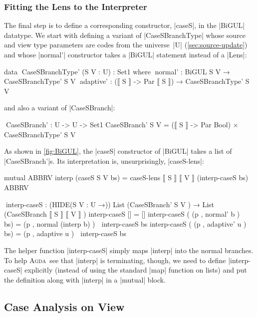 \documentclass{sigplanconf}
\newcommand{\Agda}{\textsc{Agda}}
\begin{document}
\subsubsection{Fitting the Lens to the Interpreter}

The final step is to define a corresponding constructor, |caseS|, in the |BiGUL| datatype.
We start with defining a variant of |CaseSBranchType| whose source and view type parameters are codes from the universe~|U| (\autoref{sec:source-update}) and whose |normal'| constructor takes a |BiGUL| statement instead of a |Lens|:
\begin{code}
data ^^^CaseSBranchType' (S V : U) : Set1 where
  ^^^normal'    : BiGUL S V             → CaseSBranchType' S V
  ^^^adaptive'  : (⟦ S ⟧ -> Par ⟦ S ⟧)  → CaseSBranchType' S V
\end{code}
and also a variant of |CaseSBranch|:
\begin{code}
^^^CaseSBranch' : U -> U -> Set1
CaseSBranch' S V =
  (⟦ S ⟧ -> Par Bool) × CaseSBranchType' S V
\end{code}
As shown in \autoref{fig:BiGUL}, the |caseS| constructor of |BiGUL| takes a list of |CaseSBranch'|s.
Its interpretation is, unsurprisingly, |caseS-lens|:
\begin{code}
mutual
  ABBRV
  interp (caseS {S} {V} bs) =
    caseS-lens ⟦ S ⟧ ⟦ V ⟧ (interp-caseS bs)
  ABBRV
  
  ^^^interp-caseS : (HIDE({S V : U} →))  List (CaseSBranch'   S      V    ) →
                                         List (CaseSBranch ⟦  S ⟧ ⟦  V ⟧  )
  interp-caseS []                                    = []
  interp-caseS (  (p , normal'  b           ) ∷ bs)  =
                  (p , normal   (interp b)  ) ∷ interp-caseS bs
  interp-caseS (  (p , adaptive'  u         ) ∷ bs)  =
                  (p , adaptive   u         ) ∷ interp-caseS bs
\end{code}
The helper function |interp-caseS| simply maps |interp| into the normal branches.
To help \Agda\ see that |interp| is terminating, though, we need to define |interp-caseS| explicitly (instead of using the standard |map| function on lists) and put the definition along with |interp| in a |mutual| block.

\subsection{Case Analysis on View}
\label{sec:view-case}
\end{document}
